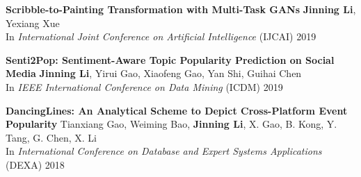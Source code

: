 \documentclass[12pt, letterpaper]{article}
\newenvironment{itemize*}%
{\begin{itemize}%
  \setlength{\itemsep}{0pt}}%
{\end{itemize}}
\newcommand{\mhead}[1]{\leavevmode\marginpar{\sffamily\footnotesize #1}}
\newcommand{\rdate}[1]{{\addfontfeature{Numbers=OldStyle} \hfill #1}}
\begin{document}

\medskip
\mhead{Publications}%
\textbf{Scribble-to-Painting Transformation with Multi-Task GANs}\href{https://www.ijcai.org/proceedings/2019/820}{}\href{https://github.com/jinningli/DSP-Net}{}\newline
\textbf{Jinning Li}, Yexiang Xue\\
In \emph{International Joint Conference on Artificial Intelligence} (IJCAI) 2019

\textbf{Senti2Pop: Sentiment-Aware Topic Popularity Prediction on Social Media}\href{http://jinningli.cn/cv/Senti2Pop.pdf}{}\newline
\textbf{Jinning Li}, Yirui Gao, Xiaofeng Gao, Yan Shi, Guihai Chen\\
In \emph{IEEE International Conference on Data Mining} (ICDM) 2019

\textbf{D\small{ancing}L\small{ines}: An Analytical Scheme to Depict Cross-Platform Event Popularity}\href{http://jinningli.cn/cv/dancinglines.pdf}{}\href{https://github.com/jinningli/dancinglines}{}\newline
Tianxiang Gao, Weiming Bao, \textbf{Jinning Li}, X. Gao, B. Kong, Y. Tang, G. Chen, X. Li\\
In \emph{International Conference on Database and Expert Systems Applications} (DEXA) 2018


\end{document}
